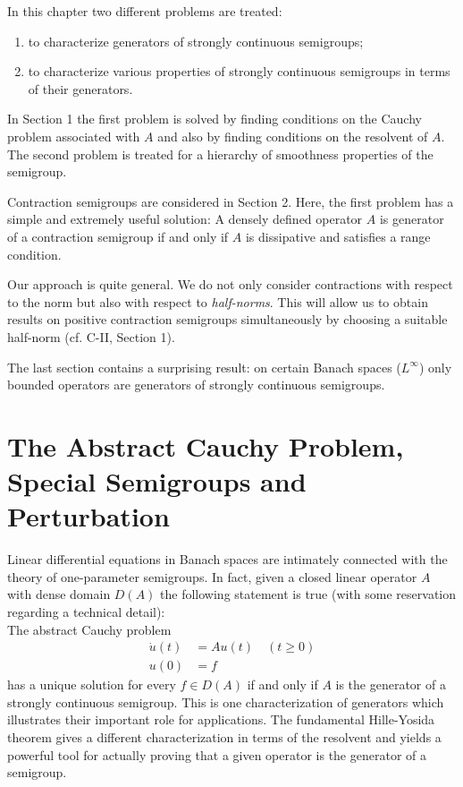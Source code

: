\setcounter{chapter}{1}
\label{chap:a2}
%
In this chapter two different problems are treated:
\begin{enumerate}[\upshape (i)]
\item 
to characterize generators of strongly continuous semigroups;
\item 
to characterize various properties of strongly continuous semigroups in terms of their generators.
\end{enumerate}
In Section 1 the first problem is solved by finding conditions on the Cauchy problem associated with $A$ and also by finding conditions on the resolvent of $A$.
The second problem is treated for a hierarchy of smoothness properties of the semigroup.

Contraction semigroups are considered in Section 2.
Here, the first problem has a simple and extremely useful solution: A densely defined operator $A$ is generator of a contraction semigroup if and only if $A$ is dissipative and satisfies a range condition.

Our approach is quite general.
We do not only consider contractions with respect to the norm but also with respect to \emph{half-norms}.
This will allow us to obtain results on positive contraction semigroups simultaneously by choosing a suitable half-norm (cf. C-II, Section 1).

The last section contains a surprising result: on certain Banach spaces (\eg $L^{\infty}$) only bounded operators are generators of strongly continuous semigroups.
\newpage
\section{The Abstract Cauchy Problem, Special Semigroups and Perturbation} \label{sec:a2-1}%
\hspace{1cm}{\Large by Wolfgang Arendt}
\vspace{.5cm}
\newline
Linear differential equations in Banach spaces are intimately connected with the theory of one-parameter semigroups.
In fact, given a closed linear operator $A$ with dense domain $D(A)$ the following statement is true (with some reservation regarding a technical detail): \\
The abstract Cauchy problem
\begin{align*}
\dot{u}(t) &= Au(t) \quad (t \geq 0) \\
u(0) &= f 
\end{align*}
has a unique solution for every $f \in D(A)$ if and only if $A$ is the generator of a strongly continuous semigroup.
This is one characterization of generators which illustrates their important role for applications.
The fundamental Hille-Yosida theorem gives a different characterization in terms of the resolvent and yields a powerful tool for actually proving that a given operator is the generator of a semigroup.

